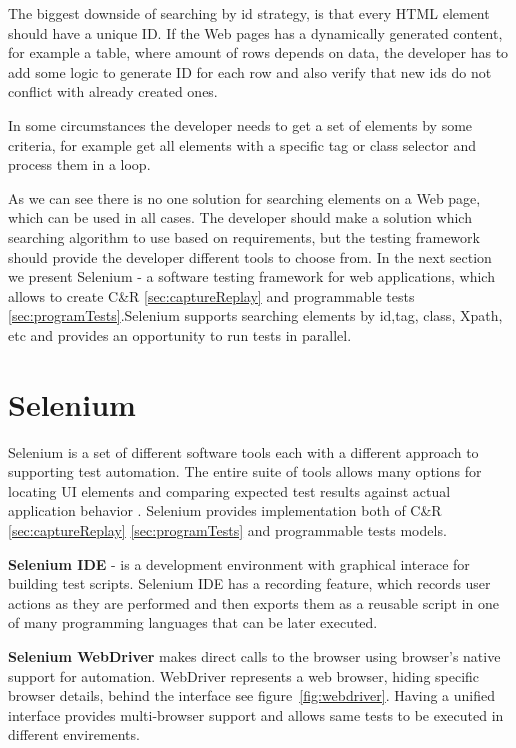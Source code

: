 		The biggest downside of searching by id strategy, is that every HTML element
		should have a unique ID. If the Web pages has a dynamically generated content,
		for example a table, where amount of rows depends on data, the
		developer has to add some logic to generate ID for each row and also verify
		that new ids do not conflict with already created ones. 
		
		In some circumstances the developer needs to get a set of elements by some
		criteria, for example get all elements with a specific tag or class selector
		and process them in a loop. 
		
		As we can see there is no one solution for searching elements on a Web page,
		which can be used in all cases. The developer should make a solution which
		searching algorithm to use based on requirements, but the testing framework
		should provide the developer different tools to choose from. In the next
		section we present Selenium - a software testing framework for web
		applications, which allows to create C\&R \ref{sec:captureReplay} and 
        programmable tests \ref{sec:programTests}.Selenium  supports searching
        elements by id,tag, class, Xpath, etc and provides an opportunity to run tests in
        parallel.
		
	\section {Selenium}
      Selenium is a set of different software tools each with a different approach
       to supporting test automation. The entire suite of tools allows many
       options for locating UI elements and comparing expected test results
       against actual application behavior \cite{seleniumSite}.
       Selenium provides implementation both of C\&R \ref{sec:captureReplay}
       \ref{sec:programTests} and programmable tests models.  
       
       \textbf{Selenium IDE} - is a development environment with graphical interace for building test scripts.
		Selenium IDE has a recording feature,  which records user actions as they are
		performed and then exports them as a reusable script in one of many programming languages that can be later executed.
       
       \textbf{Selenium  WebDriver} makes direct calls to the browser using browser's native support for automation. WebDriver represents a web browser, hiding specific browser details, behind the interface see
       figure~\ref{fig:webdriver}. Having a unified interface provides
       multi-browser support and allows same tests to be executed in different
       envirements.
       
